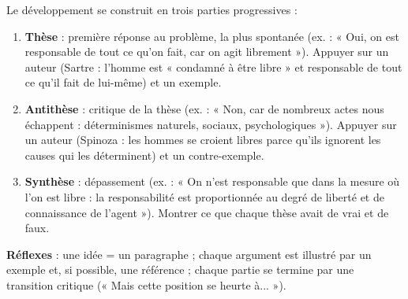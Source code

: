 \documentclass[11pt]{article}
\begin{document}
\begin{methode}
Le développement se construit en trois parties progressives :
\begin{enumerate}
\item \textbf{Thèse} : première réponse au problème, la plus spontanée (ex. : « Oui, on est responsable de tout ce qu'on fait, car on agit librement »). Appuyer sur un auteur (Sartre : l'homme est « condamné à être libre » et responsable de tout ce qu'il fait de lui-même) et un exemple.
\item \textbf{Antithèse} : critique de la thèse (ex. : « Non, car de nombreux actes nous échappent : déterminismes naturels, sociaux, psychologiques »). Appuyer sur un auteur (Spinoza : les hommes se croient libres parce qu'ils ignorent les causes qui les déterminent) et un contre-exemple.
\item \textbf{Synthèse} : dépassement (ex. : « On n'est responsable que dans la mesure où l'on est libre : la responsabilité est proportionnée au degré de liberté et de connaissance de l'agent »). Montrer ce que chaque thèse avait de vrai et de faux.
\end{enumerate}
\textbf{Réflexes} : une idée = un paragraphe ; chaque argument est illustré par un exemple et, si possible, une référence ; chaque partie se termine par une transition critique (« Mais cette position se heurte à... »).
\end{methode}
\end{document}
